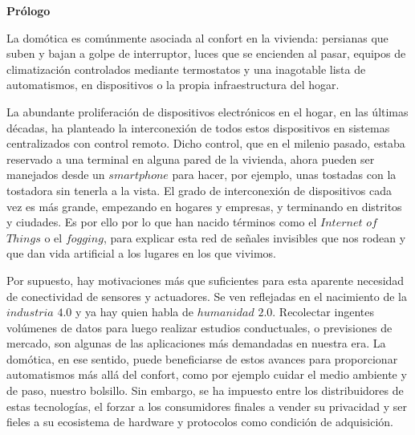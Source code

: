 
\newpage

\thispagestyle{empty}
\begin{center}

{\bf \Huge Prólogo}
\end{center}
\vspace{1cm}


La domótica es comúnmente asociada al confort en la vivienda: persianas que suben y bajan a golpe de interruptor, luces que se encienden al pasar, equipos de climatización controlados mediante termostatos y una inagotable lista de automatismos, en dispositivos o la propia infraestructura del hogar.

\vspace{0.5cm}

La abundante proliferación de dispositivos electrónicos en el hogar, en las últimas décadas, ha planteado la interconexión de todos estos dispositivos en sistemas centralizados con control remoto. Dicho control, que en el milenio pasado, estaba reservado a una terminal en alguna pared de la vivienda, ahora pueden ser manejados desde un $smartphone$ para hacer, por ejemplo, unas tostadas con la tostadora sin tenerla a la vista. El grado de interconexión de dispositivos cada vez es más grande, empezando en hogares y empresas, y terminando en distritos y ciudades. Es por ello por lo que han nacido términos como el $Internet$ $of$ $Things$ o el $fogging$, para explicar esta red de señales invisibles que nos rodean y que dan vida artificial a los lugares en los que vivimos.

\vspace{0.5cm}

Por supuesto, hay motivaciones más que suficientes para esta aparente necesidad de conectividad de sensores y actuadores. Se ven reflejadas en el nacimiento de la $industria$ $4{.}0$ y ya hay quien habla de $humanidad$ $2{.}0$. Recolectar ingentes volúmenes de datos para luego realizar estudios conductuales, o previsiones de mercado, son algunas de las aplicaciones más demandadas en nuestra era. La domótica, en ese sentido, puede beneficiarse de estos avances para proporcionar automatismos más allá del confort, como por ejemplo cuidar el medio ambiente y de paso, nuestro bolsillo. Sin embargo, se ha impuesto entre los distribuidores de estas tecnologías, el forzar a los consumidores finales a vender su privacidad y ser fieles a su ecosistema de hardware y protocolos como condición de adquisición.


